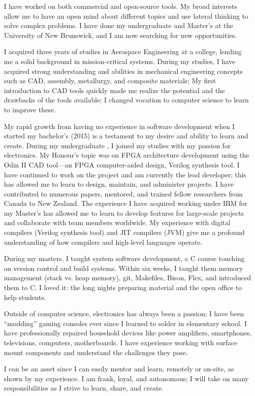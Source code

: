 I have worked on both commercial and open-source tools.
My broad interests allow me to have an open mind about different topics and use lateral thinking to solve complex problems.
I have done my undergraduate and Master’s at the University of New Brunswick, and I am now searching for new opportunities.

I acquired three years of studies in Aerospace Engineering at a college, lending me a solid background in mission-critical systems.
During my studies, I have acquired strong understanding and abilities in mechanical engineering concepts such as CAD, assembly, metallurgy, and composite materials;
My first introduction to CAD tools quickly made me realize the potential and the drawbacks of the tools available; I changed vocation to computer science to learn to improve these.

My rapid growth from having no experience in software development when I started my bachelor’s (2015) is a testament to my desire and ability to learn and create.
During my undergraduate , I joined my studies with my passion for electronics. My Honour’s topic was on FPGA architecture development using the Odin II CAD tool—an FPGA computer-aided design, Verilog synthesis tool.
I have continued to work on the project and am currently the lead developer; this has allowed me to learn to design, maintain, and administer projects.
I have contributed to numerous papers, mentored, and trained fellow researchers from Canada to New Zealand.
The experience I have acquired working under IBM for my Master’s has allowed me to learn to develop features for large-scale projects and collaborate with team members worldwide.
My experience with digital compilers (Verilog synthesis tool) and JIT compilers (JVM) give me a profound understanding of how compilers and high-level languages operate.

During my masters, I taught system software development, a C course touching on version control and build systems.
Within six weeks, I taught them memory management (stack vs. heap memory), git, Makefiles, Bison, Flex, and introduced them to C.
I loved it: the long nights preparing material and the open office to help students.

Outside of computer science, electronics has always been a passion; I have been “modding” gaming consoles ever since I learned to solder in elementary school.
I have professionally repaired household devices like power amplifiers, smartphones, televisions, computers, motherboards.
I have experience working with surface mount components and understand the challenges they pose.

I can be an asset since I can easily mentor and learn, remotely or on-site, as shown by my experience.
I am frank, loyal, and autonomous; I will take on many responsibilities as I strive to learn, share, and create.
